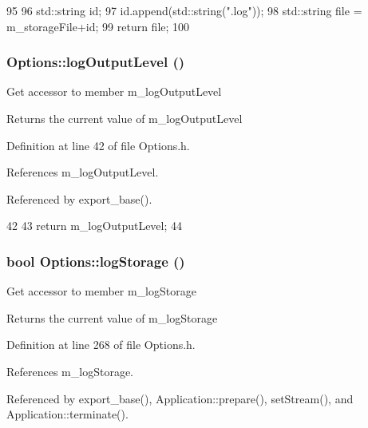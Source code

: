 \begin{DoxyCode}
95                             {
96   std::string id;
97   id.append(std::string(".log"));
98   std::string file = m_storageFile+id;
99   return file;
100 }
\end{DoxyCode}
\hypertarget{classOptions_a2d11716f34070dd7991648a26eb5d244}{
\subsubsection[{logOutputLevel}]{ Options::logOutputLevel ()}}
\label{classOptions_a2d11716f34070dd7991648a26eb5d244}
Get accessor to member m\_\-logOutputLevel \begin{DoxyReturn}{Returns}
the current value of m\_\-logOutputLevel 
\end{DoxyReturn}


Definition at line 42 of file Options.h.

References m\_\-logOutputLevel.

Referenced by export\_\-base().


\begin{DoxyCode}
42                                          {
43                 return m_logOutputLevel;
44         }
\end{DoxyCode}
\hypertarget{classOptions_a33735fffe17485937ab7579d8716b7ee}{
\subsubsection[{logStorage}]{\setlength{\rightskip}{0pt plus 5cm}bool Options::logStorage ()}}
\label{classOptions_a33735fffe17485937ab7579d8716b7ee}
Get accessor to member m\_\-logStorage \begin{DoxyReturn}{Returns}
the current value of m\_\-logStorage 
\end{DoxyReturn}


Definition at line 268 of file Options.h.

References m\_\-logStorage.

Referenced by export\_\-base(), Application::prepare(), setStream(), and Application::terminate().


